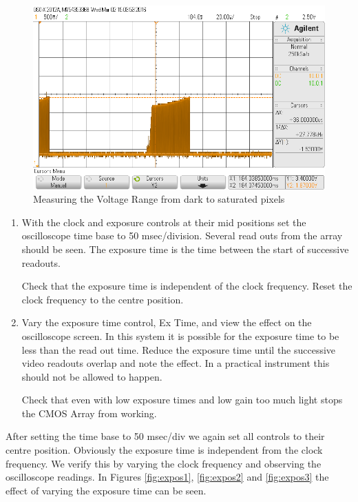 \begin{figure}[H]
\begin{center}
\includegraphics[scale=0.4]{LabFour/scope_64}
\end{center}
\caption{Measuring the Voltage Range from dark to saturated pixels}
\label{fig:clkfreq8}
\end{figure}


\begin{enumerate}
	\item With the clock and exposure controls at their mid positions set the oscilloscope time base to
50 msec/division. Several read outs from the array should be seen. The exposure time is
the time between the start of successive readouts.

Check that the exposure time is independent of the clock frequency. Reset the clock
frequency to the centre position.

	\item Vary the exposure time control, Ex Time, and view the effect on the oscilloscope screen. In
this system it is possible for the exposure time to be less than the read out time. Reduce the
exposure time until the successive video readouts overlap and note the effect. In a practical
instrument this should not be allowed to happen.

Check that even with low exposure times and low gain too much light stops the CMOS
Array from working.
\end{enumerate}

After setting the time base to 50 msec/div we again set all controls to their centre position. Obviously the exposure time is independent from the clock frequency. We verify this by varying the clock frequency and observing the oscilloscope readings.
In Figures \ref{fig:expos1}, \ref{fig:expos2} and \ref{fig:expos3} the effect of varying the exposure time can be seen. 

